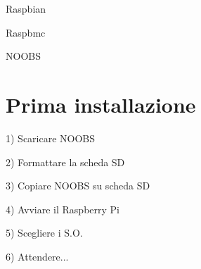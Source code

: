 \documentclass[xcolor=svgnames,11pt]{beamer}
\begin{document}
\begin{frame}{Raspbian}
\end{frame}

\begin{frame}{Raspbmc}
\end{frame}

\begin{frame}{NOOBS}
\end{frame}

\section{Prima installazione}

\begin{frame}{1) Scaricare NOOBS}
\end{frame}

\begin{frame}{2) Formattare la scheda SD}
\end{frame}

\begin{frame}{3) Copiare NOOBS su scheda SD} 
\end{frame}

\begin{frame}{4) Avviare il Raspberry Pi}
\end{frame}

\begin{frame}{5) Scegliere i S.O.}
\end{frame}

\begin{frame}{6) Attendere...}
\end{frame}
\end{document}
